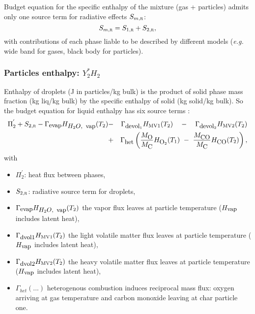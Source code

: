 Budget equation for the specific enthalpy of the mixture (gas + particles)
admits only one source term for radiative effects
$S_{m,\mbox{\scriptsize\textsc{r}}}$:
\begin{equation}
    S_{m,\mbox{\scriptsize\textsc{r}}}= S_{1,\mbox{\scriptsize\textsc{r}}}+ S_{2,\mbox{\scriptsize\textsc{r}}},
\end{equation}
with contributions of each phase liable to be described by different models (\emph{e.g.} wide band for gases, black body for particles).

\subsubsection{Particles enthalpy: $Y_{2}^{*}H_{2}$ }

Enthalpy of droplets (J in particles/kg bulk) is the product of solid phase mass
fraction (kg liq/kg bulk) by the specific enthalpy of solid (kg solid/kg
bulk). So the budget equation for liquid enthalpy has six source terms :
\begin{eqnarray*}
\Pi_{2}^{'}+S_{2,\mbox{\scriptsize\textsc{r}}}-\Gamma_{\mbox{\small evap}}H_{\mbox{\small $H_{2}O$,\, vap}}(T_{2}) & - & \Gamma_{\mbox{\small devol}_1}H_{\mbox{\scriptsize MV1}}(T_{2})\quad-\quad \Gamma_{\mbox{\small devol}_2}H_{\mbox{\scriptsize MV2}}(T_{2}) \\
                                                   & + &\Gamma_{\mbox{\small het}}\left( \dfrac{M_{\mbox{\small O}}}{M_{\mbox{\small C}}}H_{\mbox{\small O}_{2}}(T_{1})~ - ~\dfrac{M_{\mbox{\small CO}}}{M_{\mbox{\small C}}}H_{\mbox{\small CO}}(T_{2})\right),
\end{eqnarray*}
with
\begin{itemize}
  \item $\Pi_{2}^{'}$: heat flux between phases,
  \item $S_{2,\mbox{\scriptsize\textsc{r}}}$: radiative source term for droplets,
  \item $\Gamma_{\mbox{\small evap}}H_{\mbox{\small $H_{2}O$, \,vap}}(T_{2})$ the vapor
    flux leaves at particle temperature ($H_{\mbox{\small vap}}$ includes latent
    heat),
  \item $\Gamma_{\mbox{\small dvol1}}H_{\mbox{\scriptsize MV1}}(T_{2})$ the
    light volatile matter flux leaves at particle temperature ($H_{\mbox{\small
        vap}}$ includes latent heat),
  \item $\Gamma_{\mbox{\small dvol2}}H_{\mbox{\scriptsize MV2}}(T_{2})$ the
    heavy volatile matter flux leaves at particle temperature ($H_{\mbox{\small
        vap}}$ includes latent heat),
  \item $\Gamma_{het}(...)$ heterogenous combustion induces reciprocal mass
    flux: oxygen arriving at gas temperature and carbon monoxide leaving at char
    particle one.
\end{itemize}

